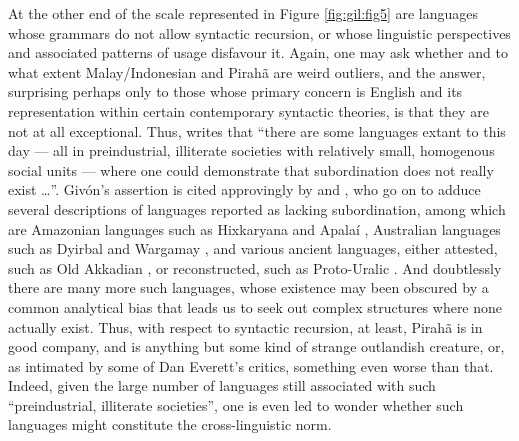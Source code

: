 \documentclass[output=paper,colorlinks,citecolor=brown
]{langscibook}
\begin{document}
At the other end of the scale represented in Figure \ref{fig:gil:fig5} are languages whose grammars do not allow syntactic recursion, or whose linguistic perspectives and associated patterns of usage disfavour it.  Again, one may ask whether and to what extent Malay/Indonesian and Pirahã are weird outliers, and the answer, surprising perhaps only to those whose primary concern is English and its representation within certain contemporary syntactic theories, is that they are not at all exceptional.  Thus, \citet[298]{givon1979understanding} writes that ``there are some languages extant to this day — all in preindustrial, illiterate societies with relatively small, homogenous social units — where one could demonstrate that subordination does not really exist  \ldots ''.  Givón's assertion is cited approvingly by \citet{pullum2010recursion} and , who go on to adduce several descriptions of languages reported as lacking subordination, among which are Amazonian languages such as Hixkaryana
\citep{derbyshire1979hixkaryana} and Apalaí \citep{koehn1986apalai}, Australian languages such as Dyirbal \citep{dixon1972dyirbal} and Wargamay \citep{dixon1981wargamay}, and various ancient languages, either attested, such as Old Akkadian \citep{deutscher2000syntactic}, or reconstructed, such as Proto-Uralic \citep{collinder1960comparative}.  And doubtlessly there are many more such languages, whose existence may been obscured by a common analytical bias that leads us to seek out complex structures where none actually exist.  Thus, with respect to syntactic recursion, at least, Pirahã is in good company, and is anything but some kind of strange outlandish creature, or, as intimated by some of Dan Everett's critics, something even worse than that.  Indeed, given the large number of languages still associated with such ``preindustrial, illiterate societies'', one is even led to wonder whether such languages might constitute the cross-linguistic norm.
\end{document}
